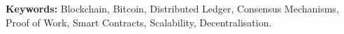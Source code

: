 \textbf{Keywords:} Blockchain, Bitcoin, Distributed Ledger, Consensus Mechanisms, Proof of Work, Smart Contracts, Scalability, Decentralisation.

\clearpage
\tableofcontents

\clearpage
\listoffigures
{}

\clearpage
\listoftables
{}

\clearpage
\printglossary[type=\acronymtype, title={List of Abbreviations}]
